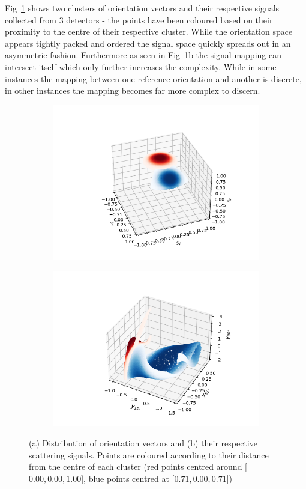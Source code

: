Fig~\ref{fig:mixing} shows two clusters of orientation 
vectors and their respective signals collected from 3 detectors
- the points have been coloured based on their proximity 
to the centre of their respective cluster. While the 
orientation space appears tightly packed and ordered the 
signal space quickly spreads out in an asymmetric fashion. 
Furthermore as seen in Fig~\ref{fig:mixing}b the signal 
mapping can intersect itself which only further increases 
the complexity. While in some instances the mapping between 
one reference orientation and another is discrete, in other 
instances the mapping becomes far more complex to discern.
\begin{figure}[h!]
	\centering
	\begin{subfigure}{0.74\textwidth}
		\subcaption{}
		\includegraphics[width=\textwidth]{fig3a.png}
	\end{subfigure}
	\begin{subfigure}{0.74\textwidth}
		\subcaption{}
		\includegraphics[width=\textwidth]{fig3b.png}
	\end{subfigure}
	\caption{(a) Distribution of orientation vectors and (b) their respective scattering signals. Points are coloured according to their distance from the centre of each cluster (red points centred around [$0.00, 0.00, 1.00$], blue points centred at [$0.71, 0.00, 0.71$])}
	\label{fig:mixing}
\end{figure}

